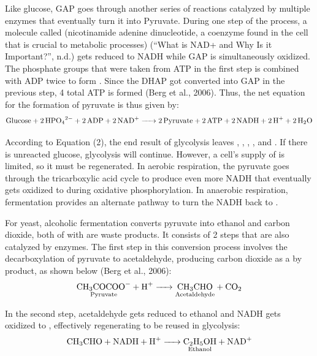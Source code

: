 \documentclass{article}
\begin{document}
Like glucose, GAP goes through another series of reactions catalyzed by multiple enzymes that eventually turn it into Pyruvate. During one step of the process, a molecule called  (nicotinamide adenine dinucleotide, a coenzyme found in the cell that is crucial to metabolic processes)  (“What is NAD+ and Why
Is it Important?”, n.d.) gets reduced to NADH while GAP is simultaneously oxidized. The phosphate groups that were taken from ATP in the first step is combined with ADP twice to form . Since the DHAP got converted into GAP in the previous step, 4 total ATP is formed (Berg et al., 2006). Thus, the net equation for the formation of pyruvate is thus given by:
\begin{equation}
    \ce{Glucose + 2HPO_{4}^{2-} + 2ADP + 2NAD+ -> 2Pyruvate + 2ATP + 2 NADH + 2H+ + 2H2O}
\end{equation}

According to Equation (2), the end result of glycolysis leaves , , , , and . If there is unreacted glucose, glycolysis will continue. However, a cell's supply of  is limited, so it must be regenerated. In aerobic respiration, the pyruvate goes through the tricarboxylic acid cycle to produce even more NADH that eventually gets oxidized to  during oxidative phosphorylation. In anaerobic respiration, fermentation provides an alternate pathway to turn the NADH back to .

\medskip

For yeast, alcoholic fermentation converts pyruvate into ethanol and carbon dioxide, both of with are waste products. It consists of 2 steps that are also catalyzed by enzymes. The first step in this conversion process involves the decarboxylation of pyruvate to acetaldehyde, producing carbon dioxide as a by product, as shown below (Berg et al., 2006):
\begin{equation}
    \ce{\underset{\text{Pyruvate}}{\ce{CH3COCOO-}} + H+ -> \underset{\text{Acetaldehyde}}{\ce{CH3CHO}} + CO2}
\end{equation}

In the second step, acetaldehyde gets reduced to ethanol and NADH gets oxidized to , effectively regenerating  to be reused in glycolysis:
\begin{equation}
    \ce{CH3CHO + NADH + H+ -> \underset{\text{Ethanol}}{\ce{C2H5OH}} + \ce{NAD+}}
\end{equation}
\end{document}
